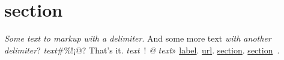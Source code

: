 \section{section}
\label{s:1}
\emph{Some text to markup with a delimiter}.
And some more text
\emph{with another delimiter}?
\emph{text}\#\%!¡@?
That’s it.
\emph{text}~!
\emph{@}
\emph{text}»
\href{url}{label}.
\url{url}.
\hyperref[s:1]{section}.
\hyperref[s:1]{section}~.

